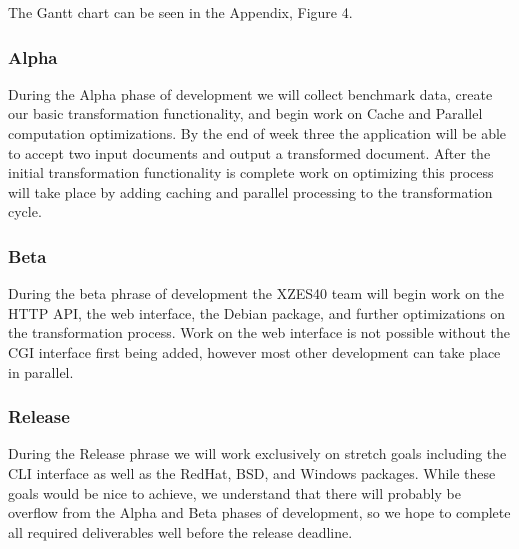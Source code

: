 The Gantt chart can be seen in the Appendix, Figure 4.

\subsubsection{Alpha}

During the Alpha phase of development we will collect benchmark data, create our basic transformation functionality, and begin work on Cache and Parallel computation optimizations.
By the end of week three the application will be able to accept two input documents and output a transformed document.
After the initial transformation functionality is complete work on optimizing this process will take place by adding caching and parallel processing to the transformation cycle.

\subsubsection{Beta}

During the beta phrase of development the XZES40 team will begin work on the HTTP API, the web interface, the Debian package, and further optimizations on the transformation process.
Work on the web interface is not possible without the CGI interface first being added, however most other development can take place in parallel.

\subsubsection{Release}

During the Release phrase we will work exclusively on stretch goals including the CLI interface as well as the RedHat, BSD, and Windows packages.
While these goals would be nice to achieve, we understand that there will probably be overflow from the Alpha and Beta phases of development, so we hope to complete all required deliverables well before the release deadline.


